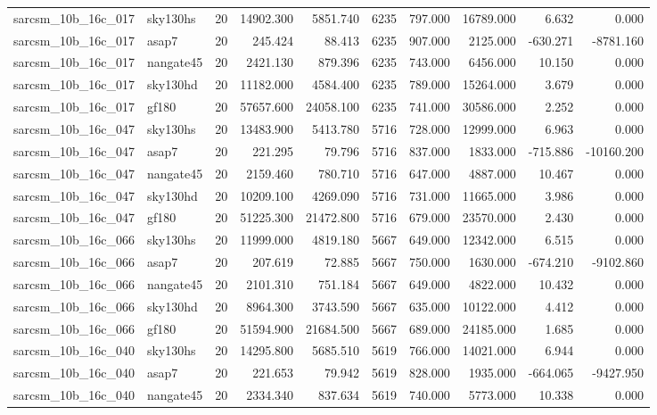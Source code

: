 \begin{tabular}{llrrrrrrrr}
sarcsm\_10b\_16c\_017 & sky130hs & 20 & 14902.300 & 5851.740 & 6235 & 797.000 & 16789.000 & 6.632 & 0.000 \\
sarcsm\_10b\_16c\_017 & asap7 & 20 & 245.424 & 88.413 & 6235 & 907.000 & 2125.000 & -630.271 & -8781.160 \\
sarcsm\_10b\_16c\_017 & nangate45 & 20 & 2421.130 & 879.396 & 6235 & 743.000 & 6456.000 & 10.150 & 0.000 \\
sarcsm\_10b\_16c\_017 & sky130hd & 20 & 11182.000 & 4584.400 & 6235 & 789.000 & 15264.000 & 3.679 & 0.000 \\
sarcsm\_10b\_16c\_017 & gf180 & 20 & 57657.600 & 24058.100 & 6235 & 741.000 & 30586.000 & 2.252 & 0.000 \\
sarcsm\_10b\_16c\_047 & sky130hs & 20 & 13483.900 & 5413.780 & 5716 & 728.000 & 12999.000 & 6.963 & 0.000 \\
sarcsm\_10b\_16c\_047 & asap7 & 20 & 221.295 & 79.796 & 5716 & 837.000 & 1833.000 & -715.886 & -10160.200 \\
sarcsm\_10b\_16c\_047 & nangate45 & 20 & 2159.460 & 780.710 & 5716 & 647.000 & 4887.000 & 10.467 & 0.000 \\
sarcsm\_10b\_16c\_047 & sky130hd & 20 & 10209.100 & 4269.090 & 5716 & 731.000 & 11665.000 & 3.986 & 0.000 \\
sarcsm\_10b\_16c\_047 & gf180 & 20 & 51225.300 & 21472.800 & 5716 & 679.000 & 23570.000 & 2.430 & 0.000 \\
sarcsm\_10b\_16c\_066 & sky130hs & 20 & 11999.000 & 4819.180 & 5667 & 649.000 & 12342.000 & 6.515 & 0.000 \\
sarcsm\_10b\_16c\_066 & asap7 & 20 & 207.619 & 72.885 & 5667 & 750.000 & 1630.000 & -674.210 & -9102.860 \\
sarcsm\_10b\_16c\_066 & nangate45 & 20 & 2101.310 & 751.184 & 5667 & 649.000 & 4822.000 & 10.432 & 0.000 \\
sarcsm\_10b\_16c\_066 & sky130hd & 20 & 8964.300 & 3743.590 & 5667 & 635.000 & 10122.000 & 4.412 & 0.000 \\
sarcsm\_10b\_16c\_066 & gf180 & 20 & 51594.900 & 21684.500 & 5667 & 689.000 & 24185.000 & 1.685 & 0.000 \\
sarcsm\_10b\_16c\_040 & sky130hs & 20 & 14295.800 & 5685.510 & 5619 & 766.000 & 14021.000 & 6.944 & 0.000 \\
sarcsm\_10b\_16c\_040 & asap7 & 20 & 221.653 & 79.942 & 5619 & 828.000 & 1935.000 & -664.065 & -9427.950 \\
sarcsm\_10b\_16c\_040 & nangate45 & 20 & 2334.340 & 837.634 & 5619 & 740.000 & 5773.000 & 10.338 & 0.000 \\

\end{tabular}
